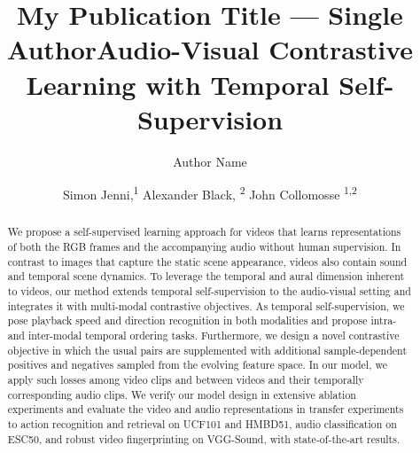 \documentclass[letterpaper]{article} %
\title{My Publication Title --- Single Author}
\author {
    Author Name
}
\title{Audio-Visual Contrastive Learning with Temporal Self-Supervision} %
\author {
    Simon Jenni,\textsuperscript{\rm 1}
    Alexander Black, \textsuperscript{\rm 2}
    John Collomosse \textsuperscript{\rm 1,\rm 2}
}
\begin{document}
\maketitle

\begin{abstract}
We propose a self-supervised learning approach for videos that learns representations of both the RGB frames and the accompanying audio without human supervision.
In contrast to images that capture the static scene appearance, videos also contain sound and temporal scene dynamics.
To leverage the temporal and aural dimension inherent to videos, our method extends temporal self-supervision to the audio-visual setting and integrates it with multi-modal contrastive objectives.
As temporal self-supervision, we pose playback speed and direction recognition in both modalities and propose intra- and inter-modal temporal ordering tasks.
Furthermore, we design a novel contrastive objective in which the usual pairs are supplemented with additional sample-dependent positives and negatives sampled from the evolving feature space.
In our model, we apply such losses among video clips and between videos and their temporally corresponding audio clips.
We verify our model design in extensive ablation experiments and evaluate the video and audio representations in transfer experiments to action recognition and retrieval on UCF101 and HMBD51, audio classification on ESC50, and robust video fingerprinting on VGG-Sound, with state-of-the-art results.

\end{abstract}
\end{document}

